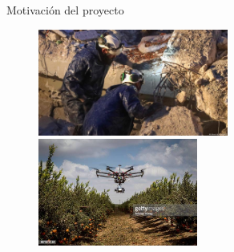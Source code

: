 \documentclass[
  24pt, %
  aspectratio=169, %
]{beamer}
\begin{document}
\begin{frame}{Motivación del proyecto}
  \begin{figure}[ht!]
        \centering
        \begin{minipage}{0.48\textwidth}
            \centering
            \includegraphics[width=\linewidth,height=3.5cm]{turquia1.jpg} %
        \end{minipage}\hfill
        \begin{minipage}{0.48\textwidth}
            \centering
            \includegraphics[width=\linewidth,height=3.5cm]{drone_agriculture.jpg} %
        \end{minipage}
        \vspace{-0.2cm} %
        \begin{minipage}{0.48\textwidth}

\end{minipage}
\end{figure}
\end{frame}
\end{document}

